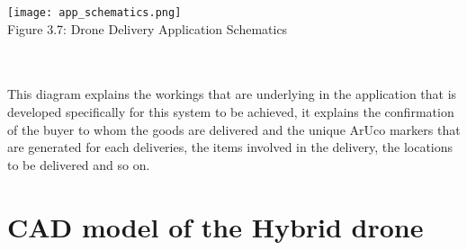 \documentclass[conference]{IEEEtran}
\begin{document}
\graphicspath{ {./images/} }
\texttt{[image: app\_schematics.png]}\\
\caption{Figure 3.7: Drone Delivery Application Schematics}\\\\
This diagram explains the workings that are underlying in the application that is developed specifically for this system to be achieved, it explains the confirmation of the buyer to whom the goods are delivered and the unique ArUco markers that are generated for each deliveries, the items involved in the delivery, the locations to be delivered and so on.\\

\section{CAD model of the Hybrid drone}\\
\end{document}
